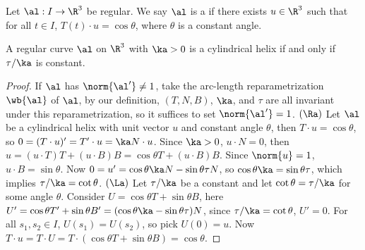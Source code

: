 \documentclass[10pt]{article}
\begin{document}
\begin{definition}
    Let $\al:I\to{\R}^{3}$ be regular. We say $\al$ is a  if there exists $u\in{\R}^{3}$ such that for all $t\in I$, $T(t)\cdot u=\cos\theta$, where $\theta$ is a constant angle.
\end{definition}
\begin{proposition}
    A regular curve $\al$ on ${\R}^{3}$ with $\ka>0$ is a cylindrical helix if and only if $\tau/\ka$ is constant.
\end{proposition}
\begin{proof}
    If $\al$ has $\norm{\al'}\ne 1$, take the arc-length reparametrization $\wb{\al}$ of $\al$, by our definition, $(T,N,B)$, $\ka$, and $\tau$ are all invariant under this reparametrization, so it suffices to set $\norm{\al'}=1$. $(\Ra)$ Let $\al$ be a cylindrical helix with unit vector $u$ and constant angle $\theta$, then $T\cdot u=\cos\theta$, so $0=(T\cdot u)'=T'\cdot u=\ka N\cdot u$. Since $\ka>0$, $u\cdot N=0$, then $u=(u\cdot T)T+(u\cdot B)B=\cos\theta T+(u\cdot B)B$. Since $\norm{u}=1$, $u\cdot B=\sin\theta$. Now $0=u'=\cos\theta\ka N-\sin\theta\tau N$, so $\cos\theta\ka=\sin\theta\tau$, which implies $\tau/\ka=\cot\theta$. $(\La)$ Let $\tau/\ka$ be a constant and let $\cot\theta=\tau/\ka$ for some angle $\theta$. Consider $U=\cos\theta T+\sin\theta B$, here $U'=\cos\theta T'+\sin\theta B'=(\cos\theta\ka-\sin\theta\tau)N$, since $\tau/\ka=\cot\theta$, $U'=0$. For all ${s}_{1},{s}_{2}\in I$, $U({s}_{1})=U({s}_{2})$, so pick $U(0)=u$. Now $T\cdot u=T\cdot U=T\cdot(\cos\theta T+\sin\theta B)=\cos\theta$.
\end{proof}


\hindex
\end{document}
